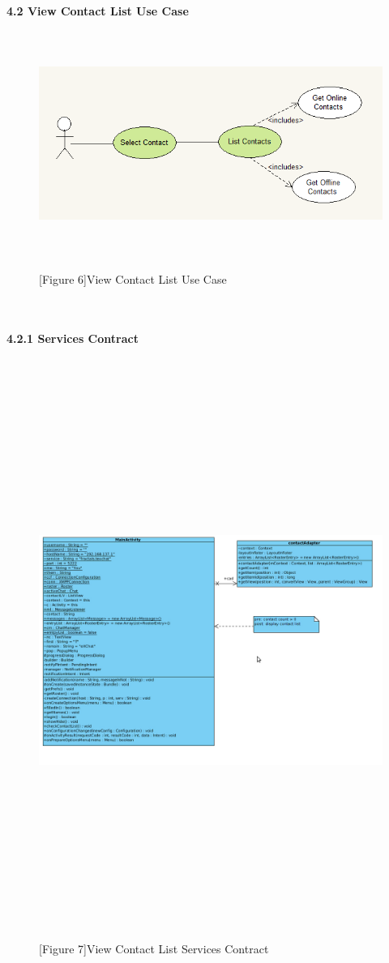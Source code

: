 \documentclass[29pt,a4paper]{moderncv}
\begin{document}
\newpage
	\\ \left\textbf{4.2 View Contact List Use Case} \\
		\begin{figure}
			\centering
			\\ \includegraphics[width=6.0in, height=2.5in]{./viewContactsCase.png} \\
			\\\caption{[Figure 6]View Contact List Use Case}
		\end{figure}\\
\newpage		
		\\ \noindent\left\textbf{4.2.1 Services Contract}\\
		\begin{figure}
		\centering
			\\ \includegraphics[width=7in, height=7.1in]{./3_ViewContactSC.jpg}
			\\\caption{[Figure 7]View Contact List Services Contract}
		\end{figure}\\
		
\end{document}
